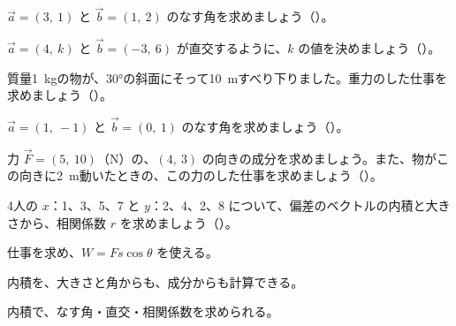 \bkproblem $\vec{a}=(3,\ 1)$ と $\vec{b}=(1,\ 2)$ のなす角を求めましょう（）。

\bkproblem $\vec{a}=(4,\ k)$ と $\vec{b}=(-3,\ 6)$ が直交するように、$k$ の値を決めましょう（）。


\bkproblem 質量\qty{1}{kg}の物が、30°の斜面にそって\qty{10}{m}すべり下りました。重力のした仕事を求めましょう（）。

\bkproblem $\vec{a}=(1,\ -1)$ と $\vec{b}=(0,\ 1)$ のなす角を求めましょう（）。

\bkproblem 力 $\vec{F}=(5,\ 10)$（N）の、$(4,\ 3)$ の向きの成分を求めましょう。また、物がこの向きに\qty{2}{m}動いたときの、この力のした仕事を求めましょう（）。

\bkproblem 4人の $x$：1、3、5、7 と $y$：2、4、2、8 について、偏差のベクトルの内積と大きさから、相関係数 $r$ を求めましょう（）。

\begin{furikaeri}
\begin{checklist}
\item 仕事を求め、$W=Fs\cos\theta$ を使える。
\item 内積を、大きさと角からも、成分からも計算できる。
\item 内積で、なす角・直交・相関係数を求められる。
\end{checklist}
\end{furikaeri}

